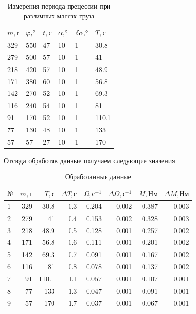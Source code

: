 \documentclass[a4paper, 12pt]{article}
\begin{document}
    \begin{table}[h!]
        \begin{center}
        \begin{tabular}{|l|l|l|l|l|l|}
        \hline
        $m, г$ &  $\varphi, \degree$ & $t, с$ & $\alpha, \degree$ & $\delta \alpha, \degree$ & $T, с$\\\hline
        329 &  550 &  47 & 10 & 1 & 30.8 \\ \hline
        279 &  500 &  57 & 10 & 1 & 41 \\\hline
        218 &  420 &  57 & 10 & 1 & 48.9 \\\hline
        171 &  380 &  60 & 10 & 1 & 56.8 \\\hline
        142 &  270 &  52 & 10 & 1 & 69.3 \\\hline
        116 &  240 &  54 & 10 & 1 & 81 \\\hline
        91 &  170 &  52 & 10 & 1 & 110.1 \\\hline
        77 &  130 &  48 & 10 & 1 & 133 \\\hline
        57 &  57 &  27 & 10 & 1 & 170 \\\hline
        \end{tabular}
         \caption{Измерения периода прецессии при различных массах груза}
        \end{center}

    \end{table}
    Отсюда обработав данные получаем следующие значения


    \begin{table}[h!]
        \begin{center}
        \begin{tabular}{|l|r|r|r|r|r|r|r|}
        \hline
        $№$ & $m, г$ &   $T, с$ & $\Delta T, с$ & $\Omega, с^{-1}$ & $\Delta\Omega, с^{-1}$ & $M, Нм$ & $\Delta M, Нм$\\\hline
        1 &  329 &  30.8 &    0.3 &  0.204 &  0.002 &  0.387 &  0.003 \\
        2 &  279 &  41 &    0.4 &  0.153 &  0.002 &  0.328 &  0.003 \\
        3 &  218 &  48.9 &    0.5 &  0.128 &  0.001 &  0.257 &  0.002 \\
        4 &  171 &  56.8 &    0.6 &  0.111 &  0.001 &  0.201 &  0.002 \\
        5 &  142 &  69.3 &    0.7 &  0.091 &  0.001 &  0.167 &  0.002 \\
        6 &  116 &  81 &    0.8 &  0.078 &  0.001 &  0.137 &  0.002 \\
        7 &  91 &  110.1 &    1.1 &  0.057 &  0.001 &  0.107 &  0.001 \\
        8 &  77 &  133 &    1.3 &  0.047 &  0.001 &  0.091 &  0.001 \\
        9 &  57 &  170 &    1.7 &  0.037 &  0.001 &  0.067 &  0.001 \\
        \hline
        \end{tabular}
         \caption{Обработанные данные}
        \end{center}

    \end{table}
\end{document}
